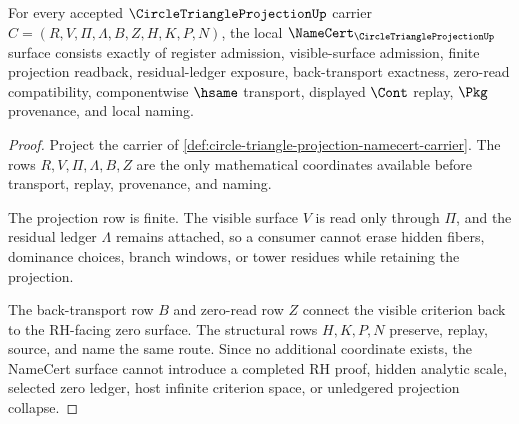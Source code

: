 \begin{theorem}
\label{thm:circle-triangle-projection-namecert-obligations}
For every accepted $\CircleTriangleProjectionUp$ carrier $C=(R,V,\Pi,\Lambda,B,Z,H,K,P,N)$, the local $\NameCert_{\CircleTriangleProjectionUp}$ surface consists exactly of register admission, visible-surface admission, finite projection readback, residual-ledger exposure, back-transport exactness, zero-read compatibility, componentwise $\hsame$ transport, displayed $\Cont$ replay, $\Pkg$ provenance, and local naming.
\end{theorem}
\begin{proof}
Project the carrier of \autoref{def:circle-triangle-projection-namecert-carrier}. The rows $R,V,\Pi,\Lambda,B,Z$ are the only mathematical coordinates available before transport, replay, provenance, and naming.

The projection row is finite. The visible surface $V$ is read only through $\Pi$, and the residual ledger $\Lambda$ remains attached, so a consumer cannot erase hidden fibers, dominance choices, branch windows, or tower residues while retaining the projection.

The back-transport row $B$ and zero-read row $Z$ connect the visible criterion back to the RH-facing zero surface. The structural rows $H,K,P,N$ preserve, replay, source, and name the same route. Since no additional coordinate exists, the NameCert surface cannot introduce a completed RH proof, hidden analytic scale, selected zero ledger, host infinite criterion space, or unledgered projection collapse.
\end{proof}




